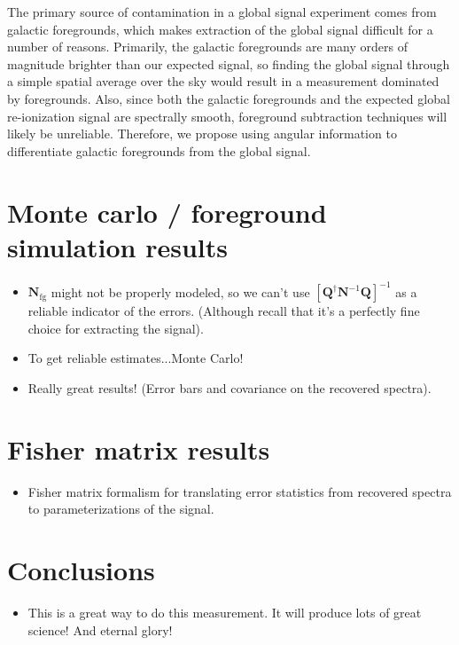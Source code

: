 \documentclass[twolcolumn,apj]{emulateapj}
\begin{document}
The primary source of contamination in a global signal experiment comes from galactic foregrounds, which makes extraction of the global signal difficult for a number of reasons. Primarily, the galactic foregrounds are many orders of magnitude brighter than our expected signal, so finding the global signal through a simple spatial average over the sky would result in a measurement dominated by foregrounds. Also, since both the galactic foregrounds and the expected global re-ionization signal are spectrally smooth, foreground subtraction techniques will likely be unreliable. Therefore, we propose using angular information to differentiate galactic foregrounds from the global signal. 


\section{Monte carlo / foreground simulation results}
\begin{itemize}
\item $\mathbf{N}_\textrm{fg}$ might not be properly modeled, so we can't use $[\mathbf{Q}^\dagger \mathbf{N}^{-1} \mathbf{Q}]^{-1}$ as a reliable indicator of the errors.  (Although recall that it's a perfectly fine choice for extracting the signal).
\item To get reliable estimates...Monte Carlo!
\item Really great results! (Error bars and covariance on the recovered spectra).
\end{itemize}

\section{Fisher matrix results}
\begin{itemize}
\item Fisher matrix formalism for translating error statistics from recovered spectra to parameterizations of the signal.
\end{itemize}

\section{Conclusions}
\begin{itemize}
\item This is a great way to do this measurement.  It will produce lots of great science! And eternal glory!
\end{itemize}


\end{document}
